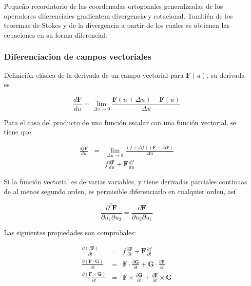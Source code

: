 Pequeño recordatorio de las coordenadas ortogonales generalizadas de los operadores diferenciales gradientem divergencia y rotacional. También de los teoremas de Stokes y de la divergencia a partir de los cuales se obtienen las ecuaciones en su forma diferencial. 

\subsubsection{Diferenciacion de campos vectoriales}

Definición clásica de la derivada de un campo vectorial para $\mathbf{F}(u)$, su derivada es

\begin{equation*}
\frac{d \mathbf{F}}{d u} = \lim_{\Delta u \to 0} \frac{\mathbf{F}(u + \Delta u)- \mathbf{F}(u)}{\Delta u}
\end{equation*}

Para el caso del producto de una función escalar con una función vectorial, se tiene que

\begin{eqnarray*}
\frac{d f \mathbf{F}}{d u} &=& \lim_{\Delta u \to 0}  \frac{(f+\Delta f)(\mathbf{F}+\Delta \mathbf{F})}{\Delta u} \\
&=& f \frac{d \mathbf{F}}{d u} + \mathbf{F} \frac{df}{du}
\end{eqnarray*}

Si la función vectorial es de varias variables, y tiene derivadas parciales continuas de al menos segundo orden, es permisible diferenciarlo en cualquier orden, así

\begin{equation*}
\frac{\partial^{2} \mathbf{F}}{\partial u_1 \partial u_2} = \frac{\partial \mathbf{F}}{\partial u_2 \partial u_1}
\end{equation*}

Las siguientes propiedades son comprobales:

\begin{eqnarray*}
 \frac{\partial (f\mathbf{F})}{\partial t} &=& f \frac{\partial \mathbf{F}}{\partial t} + \mathbf{F} \frac{\partial f}{\partial t} \\
 \frac{\partial (\mathbf{F} \cdot \mathbf{G})}{\partial t} &=& \mathbf{F} \cdot \frac{\partial \mathbf{G} }{\partial t } + \mathbf{G} \cdot \frac{\partial \mathbf{F} }{\partial t } \\
 \frac{\partial (\mathbf{F} \times \mathbf{G})}{\partial t} &=& \mathbf{F} \times \frac{\partial \mathbf{G} }{\partial t } + \frac{\partial \mathbf{F} }{\partial t } \times \mathbf{G}
\end{eqnarray*}

